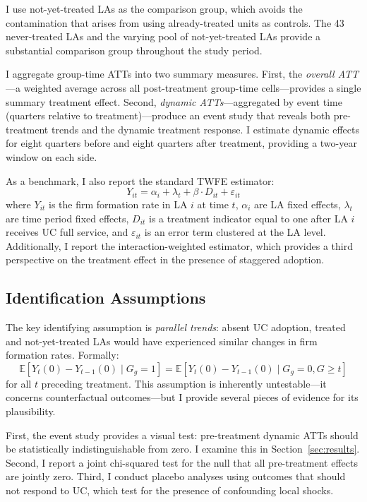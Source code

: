 \documentclass[12pt]{article}
\newcommand{\E}{\mathbb{E}}
\begin{document}
I use not-yet-treated LAs as the comparison group, which avoids the contamination that arises from using already-treated units as controls. The 43 never-treated LAs and the varying pool of not-yet-treated LAs provide a substantial comparison group throughout the study period.

I aggregate group-time ATTs into two summary measures. First, the \textit{overall ATT}---a weighted average across all post-treatment group-time cells---provides a single summary treatment effect. Second, \textit{dynamic ATTs}---aggregated by event time (quarters relative to treatment)---produce an event study that reveals both pre-treatment trends and the dynamic treatment response. I estimate dynamic effects for eight quarters before and eight quarters after treatment, providing a two-year window on each side.

As a benchmark, I also report the standard TWFE estimator:
\begin{equation}
Y_{it} = \alpha_i + \lambda_t + \beta \cdot D_{it} + \varepsilon_{it}
\end{equation}
where $Y_{it}$ is the firm formation rate in LA $i$ at time $t$, $\alpha_i$ are LA fixed effects, $\lambda_t$ are time period fixed effects, $D_{it}$ is a treatment indicator equal to one after LA $i$ receives UC full service, and $\varepsilon_{it}$ is an error term clustered at the LA level. Additionally, I report the \citet{sun2021estimating} interaction-weighted estimator, which provides a third perspective on the treatment effect in the presence of staggered adoption.

\subsection{Identification Assumptions}

The key identifying assumption is \textit{parallel trends}: absent UC adoption, treated and not-yet-treated LAs would have experienced similar changes in firm formation rates. Formally:
\begin{equation}
\E[Y_t(0) - Y_{t-1}(0) \mid G_g = 1] = \E[Y_t(0) - Y_{t-1}(0) \mid G_g = 0, G \geq t]
\end{equation}
for all $t$ preceding treatment. This assumption is inherently untestable---it concerns counterfactual outcomes---but I provide several pieces of evidence for its plausibility.

First, the event study provides a visual test: pre-treatment dynamic ATTs should be statistically indistinguishable from zero. I examine this in Section~\ref{sec:results}. Second, I report a joint chi-squared test for the null that all pre-treatment effects are jointly zero. Third, I conduct placebo analyses using outcomes that should not respond to UC, which test for the presence of confounding local shocks.
\end{document}
